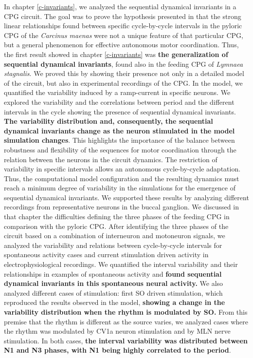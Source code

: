 	
In chapter \ref{c-invariants}, we analyzed the sequential dynamical invariants in a CPG circuit. The goal was to prove the hypothesis presented in \textcite{elices_robust_2019} that the strong linear relationships found between specific cycle-by-cycle intervals in the pyloric CPG of the \textit{Carcinus maenas} were not a unique feature of that particular CPG, but a general phenomenon for effective autonomous motor coordination. Thus, the first result showed in chapter \ref{c-invariants} was \textbf{the generalization of sequential dynamical invariants}, found also in the feeding CPG of \textit{Lymnaea stagnalis}. We proved this by showing their presence not only in a detailed model of the circuit, but also in experimental recordings of the CPG. In the model, we quantified the variability induced by a ramp-current in specific neurons. We explored the variability and the correlations between period and the different intervals in the cycle showing the presence of sequential dynamical invariants.  \textbf{The variability distribution and, consequently, the sequential dynamical invariants change as the neuron stimulated in the model simulation changes}. This highlights the importance of the balance between robustness and flexibility of the sequences for motor coordination through the relation between the neurons in the circuit dynamics. The restriction of variability in specific intervals allows an autonomous cycle-by-cycle adaptation. Thus, the computational model configuration and the resulting dynamics must reach a minimum degree of variability in the simulations for the emergence of sequential dynamical invariants. We supported these results by  analyzing different recordings from representative neurons in the buccal ganglion. We discussed in that chapter the difficulties defining the three phases of the feeding CPG in comparison with the pyloric CPG. After identifying the three phases of the circuit based on a combination of interneuron and motoneuron signals, we analyzed the variability and relations between cycle-by-cycle intervals for spontaneous activity cases and current stimulation driven activity in electrophysiological recordings. We quantified the interval variability and their relationships in examples of spontaneous activity and \textbf{found sequential dynamical invariants in this spontaneous neural activity.} We also analyzed different cases of stimulation: first SO driven stimulation, which reproduced the results observed in the model, \textbf{showing a change in the variability distribution when the rhythm is modulated by SO.} From this premise that the rhythm is different as the source varies, we analyzed cases where the rhythm was modulated by CV1a neuron stimulation and by MLN nerve stimulation. In both cases, \textbf{the interval variability was distributed between N1 and N3 phases, with N1 being highly correlated to the period}.

